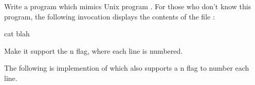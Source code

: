 \begin{Exercise}[title={Cat},difficulty=6]
\label{ex:cat}
\Question \label{ex:cat q1} Write a program which mimics Unix program
. For those who don't know this program, the following 
invocation displays the contents of the file :
\begin{display}
\pr cat blah
\end{display}

\Question Make it support the \-n flag, where each line is
numbered.

\end{Exercise}

\begin{Answer}
\Question The following is implemention of  which also 
supports a \-n flag to number each line.

\listremarks
\end{Answer}
